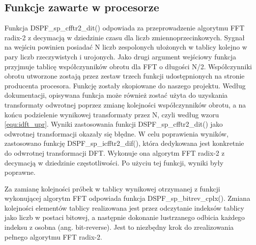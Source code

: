 \subsection{Funkcje zawarte w procesorze}
Funkcja DSPF\_sp\_cfftr2\_dit() odpowiada za przeprowadzenie algorytmu FFT radix-2 z decymacją w dziedzinie czasu dla liczb zmiennoprzecinkowych. Sygnał na wejściu powinien posiadać N liczb zespolonych ułożonych w tablicy kolejno w pary liczb rzeczywistych i urojonych. Jako drugi argument wejściowy funkcja przyjmuje tablicę współczynników obrotu dla FFT o długości N/2. Współczynniki obrotu utworzone zostają przez zestaw trzech funkcji udostępnionych na stronie producenta procesora. Funkcję zostały skopiowane do naszego projektu. %
Według dokumentacji, opisywana funkcja może również zostać użyta do uzyskania transformaty odwrotnej poprzez zmianę kolejności współczynników obrotu, a na końcu podzielenie wynikowej transformaty przez N, czyli według wzoru \ref{equ:idft_upr}. Wyniki zastosowania funkcji DSPF\_sp\_cfftr2\_dit() jako odwrotnej transformacji okazały się błędne. W celu poprawienia wyników, zastosowano funkcję DSPF\_sp\_icfftr2\_dif(), która dedykowana jest konkretnie do odwrotnej transformacji DFT. Wykonuje ona algorytm FFT radix-2 z decymacją w dziedzinie częstotliwości. Po użyciu tej funkcji, wyniki były poprawne.

Za zamianę kolejności próbek w tablicy wynikowej otrzymanej z funkcji wykonującej algorytm FFT odpowiada funkcja DSPF\_sp\_bitrev\_cplx(). Zmiana kolejności elementów tablicy realizowana jest przez odczytanie indeksów tablicy jako liczb w postaci bitowej, a następnie dokonanie lustrzanego odbicia każdego indeksu z osobna (ang. bit-reverse). Jest to niezbędny krok do zrealizowania pełnego algorytmu FFT radix-2.

